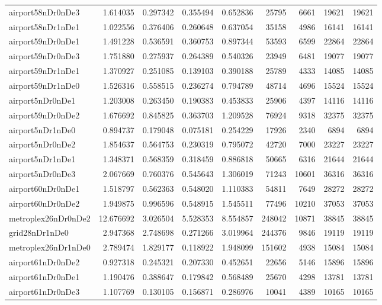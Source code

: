 \begin{longtable}{|l|r|r|r|r|r|r|r|r|}
airport58nDr0nDe3 & 1.614035 & 0.297342 & 0.355494 & 0.652836 & 25795 & 6661 & 19621 & 19621 \\
airport58nDr1nDe1 & 1.022556 & 0.376406 & 0.260648 & 0.637054 & 35158 & 4986 & 16141 & 16141 \\
airport59nDr0nDe1 & 1.491228 & 0.536591 & 0.360753 & 0.897344 & 53593 & 6599 & 22864 & 22864 \\
airport59nDr0nDe3 & 1.751880 & 0.275937 & 0.264389 & 0.540326 & 23949 & 6481 & 19077 & 19077 \\
airport59nDr1nDe1 & 1.370927 & 0.251085 & 0.139103 & 0.390188 & 25789 & 4333 & 14085 & 14085 \\
airport59nDr1nDe0 & 1.526316 & 0.558515 & 0.236274 & 0.794789 & 48714 & 4696 & 15524 & 15524 \\
airport5nDr0nDe1 & 1.203008 & 0.263450 & 0.190383 & 0.453833 & 25906 & 4397 & 14116 & 14116 \\
airport59nDr0nDe2 & 1.676692 & 0.845825 & 0.363703 & 1.209528 & 76924 & 9318 & 32375 & 32375 \\
airport5nDr1nDe0 & 0.894737 & 0.179048 & 0.075181 & 0.254229 & 17926 & 2340 & 6894 & 6894 \\
airport5nDr0nDe2 & 1.854637 & 0.564753 & 0.230319 & 0.795072 & 42720 & 7000 & 23227 & 23227 \\
airport5nDr1nDe1 & 1.348371 & 0.568359 & 0.318459 & 0.886818 & 50665 & 6316 & 21644 & 21644 \\
airport5nDr0nDe3 & 2.067669 & 0.760376 & 0.545643 & 1.306019 & 71243 & 10601 & 36316 & 36316 \\
airport60nDr0nDe1 & 1.518797 & 0.562363 & 0.548020 & 1.110383 & 54811 & 7649 & 28272 & 28272 \\
airport60nDr0nDe2 & 1.949875 & 0.996596 & 0.548915 & 1.545511 & 77496 & 10210 & 37053 & 37053 \\
metroplex26nDr0nDe2 & 12.676692 & 3.026504 & 5.528353 & 8.554857 & 248042 & 10871 & 38845 & 38845 \\
grid28nDr1nDe0 & 2.947368 & 2.748698 & 0.271266 & 3.019964 & 244376 & 9846 & 19119 & 19119 \\
metroplex26nDr1nDe0 & 2.789474 & 1.829177 & 0.118922 & 1.948099 & 151602 & 4938 & 15084 & 15084 \\
airport61nDr0nDe2 & 0.927318 & 0.245321 & 0.207330 & 0.452651 & 22656 & 5146 & 15896 & 15896 \\
airport61nDr0nDe1 & 1.190476 & 0.388647 & 0.179842 & 0.568489 & 25670 & 4298 & 13781 & 13781 \\
airport61nDr0nDe3 & 1.107769 & 0.130105 & 0.156871 & 0.286976 & 10041 & 4389 & 10165 & 10165 \\

\end{longtable}
